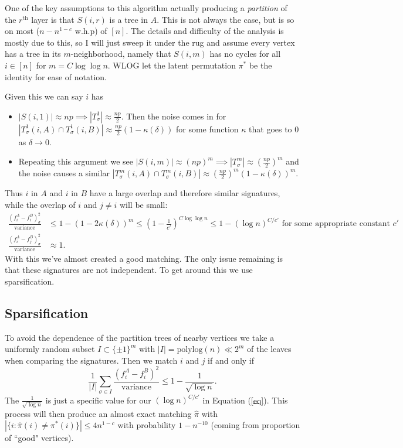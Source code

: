 \documentclass[11pt]{article}
\begin{document}
One of the key assumptions to this algorithm actually producing a \emph{partition} of the $ r^{\text{th}} $ layer is that $ S(i,r) $ is a tree in $ A $. This is not always the case, but is so on most ($ n-n^{1-c} $ w.h.p) of $ [n] $. The details and difficulty of the analysis is mostly due to this, so I will just sweep it under the rug and assume every vertex has a tree in its $ m $-neighborhood, namely that $ S(i,m) $ has no cycles for all $ i\in [n] $ for $ m=C\log\log n $. WLOG let the latent permutation $ \pi^* $ be the identity for ease of notation.

Given this we can say $ i $ has
\begin{itemize}
	\item $ |S(i,1)| \approx np \implies | T_\sigma^1 | \approx \frac{np}{2} $. Then the noise comes in for $ |T_\sigma^1(i, A)\cap T_\sigma^1(i,B)| \approx \frac{np}{2} (1-\kappa(\delta)) $ for some function $ \kappa $ that goes to $ 0 $ as $ \delta \to 0 $.
	\item Repeating this argument we see $ |S(i,m)| \approx (np)^m \implies | T_\sigma^m | \approx \left(\frac{np}{2}\right)^m $ and the noise causes a similar $ |T_\sigma^m(i, A)\cap T_\sigma^m(i,B)| \approx \left(\frac{np}{2}\right)^m (1-\kappa(\delta))^m $.
\end{itemize}
Thus $ i $ in $ A $ and $ i $ in $ B $ have a large overlap and therefore similar signatures, while the overlap of $ i $ and $ j\neq i $ will be small:
\begin{align}\label{eq}
	\frac{(f_i^A - f_i^B)_\sigma^2}{\text{variance}} &\leq 1-(1-2\kappa(\delta))^m \leq \left(1-\frac{1}{c'}\right)^{C\log\log n} \leq 1-(\log n)^{C/c'} \text{ for some appropriate constant } c'\\
	\frac{(f_i^A - f_j^B)_\sigma^2}{\text{variance}} &\approx 1.
\end{align}
With this we've almost created a good matching. The only issue remaining is that these signatures are not independent. To get around this we use sparsification.

\subsection{Sparsification}
To avoid the dependence of the partition trees of nearby vertices we take a uniformly random subset $ I\subset \{\pm 1\}^m $ with $ |I|=\text{polylog}(n) \ll 2^m $ of the leaves when comparing the signatures. Then we match $ i $ and $ j $ if and only if
\[ \frac{1}{|I|}\sum_{\sigma\in I} \frac{(f_i^A - f_i^B)^2}{\text{variance}} \leq 1-\frac{1}{\sqrt{\log n}}. \]
The $ \frac{1}{\sqrt{\log n}} $ is just a specific value for our $ (\log n)^{C/c'} $ in Equation (\ref{eq}).
This process will then produce an almost exact matching $ \hat \pi $ with $ |\{ i:\hat \pi(i) \neq \pi^*(i) \}|\leq 4n^{1-c} $ with probability $ 1-n^{-10} $ (coming from proportion of ``good" vertices).
\end{document}
